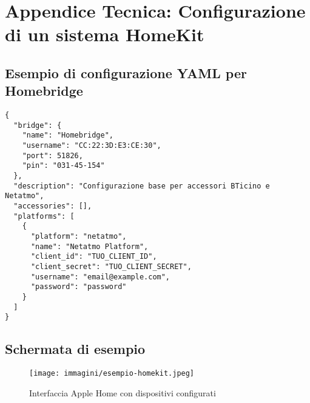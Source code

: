 \chapter{Appendice Tecnica: Configurazione di un sistema HomeKit}
\section*{Esempio di configurazione YAML per Homebridge}
\begin{verbatim}
{
  "bridge": {
    "name": "Homebridge",
    "username": "CC:22:3D:E3:CE:30",
    "port": 51826,
    "pin": "031-45-154"
  },
  "description": "Configurazione base per accessori BTicino e Netatmo",
  "accessories": [],
  "platforms": [
    {
      "platform": "netatmo",
      "name": "Netatmo Platform",
      "client_id": "TUO_CLIENT_ID",
      "client_secret": "TUO_CLIENT_SECRET",
      "username": "email@example.com",
      "password": "password"
    }
  ]
}
\end{verbatim}

\section*{Schermata di esempio}
\begin{figure}[h!]
    \centering
    \texttt{[image: immagini/esempio-homekit.jpeg]}
    \caption{Interfaccia Apple Home con dispositivi configurati}
    \label{fig:homekit-interface}
\end{figure}


